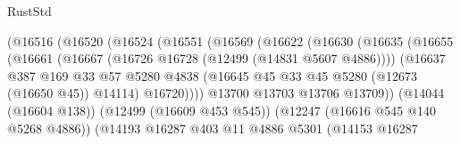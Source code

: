 \begin{lexlean}{RustStd}
\begin{coremodule}
                                  (@16516
                                    (@16520
                                      (@16524
                                        (@16551
                                          (@16569
                                            (@16622
                                              (@16630
                                                (@16635
                                                  (@16655
                                                    (@16661
                                                      (@16667
                                                        (@16726
                                                          @16728
                                                          (@12499 (@14831 @5607 @4886))))
                                                      (@16637
                                                        @387
                                                        @169
                                                        @33
                                                        @57
                                                        @5280
                                                        @4838
                                                        (@16645
                                                          @45
                                                          @33
                                                          @45
                                                          @5280
                                                          (@12673 (@16650 @45))
                                                          @14114)
                                                        @16720))))
                                                @13700
                                                @13703
                                                @13706
                                                @13709))
                                            (@14044 (@16604 @138))
                                            (@12499 (@16609 @453 @545))
                                            (@12247 (@16616 @545 @140 @5268 @4886))
                                            (@14193
                                              @16287
                                              @403
                                              @11
                                              @4886
                                              @5301
                                              (@14153
                                                @16287

\end{coremodule}
\end{lexlean}
